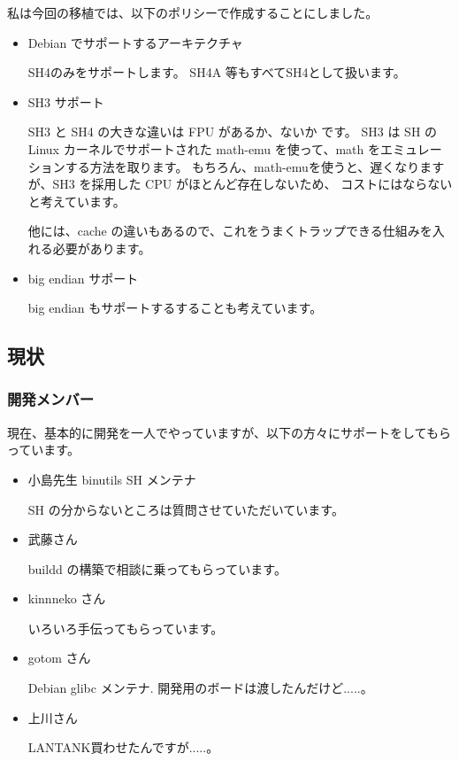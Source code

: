 \documentclass[mingoth,a4paper]{jsarticle}
\begin{document}
私は今回の移植では、以下のポリシーで作成することにしました。

\begin{itemize}
 \item Debian でサポートするアーキテクチャ

   SH4のみをサポートします。
   SH4A 等もすべてSH4として扱います。
   
 \item SH3 サポート
 
   SH3 と SH4 の大きな違いは FPU があるか、ないか です。
   SH3 は SH の Linux カーネルでサポートされた math-emu を使って、math をエミュレーションする方法を取ります。
   もちろん、math-emuを使うと、遅くなりますが、SH3 を採用した CPU がほとんど存在しないため、
   コストにはならないと考えています。
   
   他には、cache の違いもあるので、これをうまくトラップできる仕組みを入れる必要があります。
   
 \item big endian サポート
 
   big endian もサポートするすることも考えています。
   
\end{itemize} 

\subsection{現状}

\subsubsection{開発メンバー}
現在、基本的に開発を一人でやっていますが、以下の方々にサポートをしてもらっています。

\begin{itemize}

	\item 小島先生
		binutils SH メンテナ
		
		SH の分からないところは質問させていただいています。

	\item 武藤さん
	
		buildd の構築で相談に乗ってもらっています。

	\item kinnneko さん
	
		いろいろ手伝ってもらっています。

	\item gotom さん
	
		Debian glibc メンテナ.
		開発用のボードは渡したんだけど.....。

	\item 上川さん
	
		LANTANK買わせたんですが.....。
\end{itemize}
\end{document}
